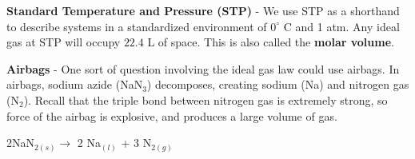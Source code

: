 \documentclass{article}
\begin{document}
	\noindent \textbf{Standard Temperature and Pressure (STP)} - We use STP as a shorthand to describe systems in a standardized environment of $0^{\circ}$ C and 1 atm. Any ideal gas at STP will occupy $22.4$ L of space. This is also called the \textbf{molar volume}.\\
	\pagebreak
	
	\noindent\textbf{Airbags} - One sort of question involving the ideal gas law could use airbags. In airbags, sodium azide (NaN$_3$) decomposes, creating sodium (Na) and nitrogen gas (N$_2$). Recall that the triple bond between nitrogen gas is extremely strong, so force of the airbag is explosive, and produces a large volume of gas.\\
	\vspace{-10pt}
	\begin{center}
		2NaN$_{2(s)} \longrightarrow$ 2 Na$_(l)$ + 3 N$_{2(g)}$
	\end{center}
	
\end{document}
